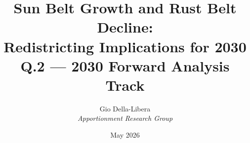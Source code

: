 \documentclass[12pt]{article}
\title{\textbf{Sun Belt Growth and Rust Belt Decline:\\
Redistricting Implications for 2030}\\[0.4em]
\large Q.2 --- 2030 Forward Analysis Track}
\author{Gio Della-Libera \\ \textit{Apportionment Research Group}}
\date{May 2026}
\begin{document}
\maketitle
\begin{abstract}\end{abstract}





\end{document}
